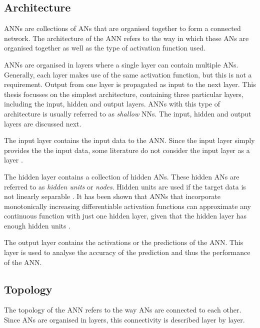 \subsection{Architecture}
\label{sec:anns:anns:architecture}

\acp{ANN} are collections of \acp{AN} that are organised together to form a
connected network. The architecture of the \ac{ANN} refers to the way in which
these \acp{AN} are organised together as well as the type of activation function used.

\acp{ANN} are organised in layers where a single layer can contain multiple
\acp{AN}. Generally, each layer makes use of the same activation function, but this is not a requirement. Output from one
layer is propagated as input to the next layer. This thesis focusses on the
simplest architecture, containing three particular layers, including the input,
hidden and output layers. \acp{ANN} with this type of architecture is usually
referred to as \textit{shallow} \acp{NN}. The input, hidden and output layers
are discussed next.

The input layer contains the input data to the \ac{ANN}. Since the
input layer simply provides the the input data, some literature do not consider
the input layer as a layer \cite{ref:engelbrecht:2007}.

The hidden layer contains a collection of hidden \acp{AN}. These hidden \acp{AN}
are referred to as \textit{hidden units} or \textit{nodes}. Hidden units are
used if the target data is not linearly separable \cite{ref:engelbrecht:2007}.
It has been shown that \acp{ANN} that incorporate monotonically increasing
differentiable activation functions can approximate
any continuous function with just one hidden layer, given that the hidden layer
has enough hidden units \cite{ref:hornik:1989}. 

The output layer contains the activations or the predictions of the \ac{ANN}.
This layer is used to analyse the accuracy of the prediction and thus the
performance of the \ac{ANN}.


\subsection{Topology}
\label{sec:anns:anns:topology}

The topology of the \ac{ANN} refers to the way \acp{AN} are connected to each
other. Since \acp{AN} are organised in layers, this connectivity is described
layer by layer.

